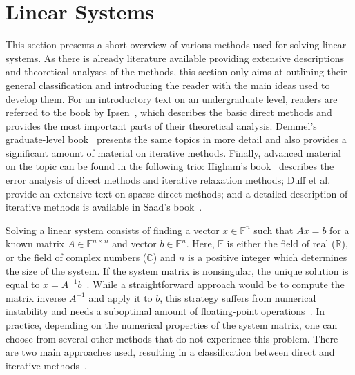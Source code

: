\section{Linear Systems}
\label{introduction:sec:linear-systems}

This section presents a short overview of various methods used for solving
linear systems. As there is already literature available providing extensive
descriptions and theoretical analyses of the methods, this section only aims at
outlining their general classification and introducing the reader with the main
ideas used to develop them. For an introductory text on an undergraduate level,
readers are referred to the book by Ipsen~\cite{Ipsen2009}, which describes the
basic direct methods and provides the most important parts of their theoretical
analysis. Demmel's graduate-level book~\cite{demmel} presents the same topics in
more detail and also provides a significant amount of material on iterative
methods. Finally, advanced material on the topic can be found in the following
trio: Higham's book~\cite{higham} describes the error analysis of direct methods
and iterative relaxation methods; Duff et al.~\cite{duff} provide an extensive
text on sparse direct methods; and a detailed description of iterative
methods is available in Saad's book~\cite{saad}.

Solving a linear system consists of finding a vector $x \in \mathbb{F}^n$ such
that $Ax = b$ for a known matrix $A \in \mathbb{F}^{n \times n}$ and vector $b
\in \mathbb{F}^n$. Here, $\mathbb{F}$ is either the field of real
($\mathbb{R}$), or the field of complex numbers ($\mathbb{C}$) and $n$ is a
positive integer which determines the size of the system. If the system matrix
is nonsingular, the unique solution is equal to $x = A^{-1}b$~\cite{demmel}.
While a straightforward approach would be to compute the matrix inverse $A^{-1}$
and apply it to $b$, this strategy suffers from numerical instability and
needs a suboptimal amount of floating-point
operations~\cite{demmel,Ipsen2009}. In practice, depending on the numerical
properties of the system matrix, one can choose from several
other methods that do not experience this problem. There are two main approaches
used, resulting in a classification between direct and iterative
methods~\cite{demmel}.

